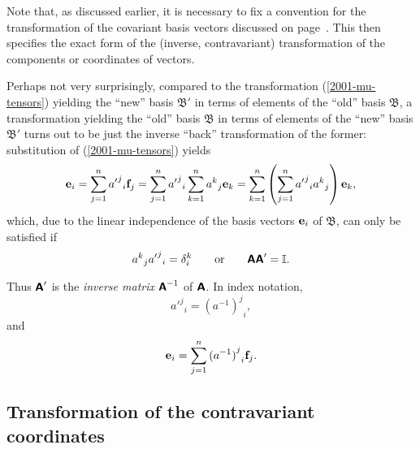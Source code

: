 Note that, as discussed earlier, it is necessary to fix a convention for the transformation of the covariant basis vectors discussed on page~\pageref{2016-m-ch-fdvs-oic}.
This then specifies the exact form of the (inverse, contravariant) transformation of the components or coordinates of vectors.



Perhaps not very surprisingly, compared to the transformation (\ref{2001-mu-tensors}) yielding the ``new'' basis
${\mathfrak B'}$  in terms of elements of the ``old'' basis ${\mathfrak B}$,
a transformation  yielding the ``old'' basis
${\mathfrak B}$  in terms of elements of the ``new'' basis ${\mathfrak B'}$ turns out to be just the inverse ``back'' transformation of the former:
substitution of (\ref{2001-mu-tensors}) yields
\begin{equation}
{\bf e}_i=\sum_{j=1}^n {{a'}^j}_i {\bf f}_j
=\sum_{j=1}^n {{a'}^j}_i  \sum_{k=1}^n {a^k}_j {\bf e}_k
=\sum_{k=1}^n \left(\sum_{j=1}^n  {{a'}^j}_i  {a^k}_j \right) {\bf e}_k,
\end{equation}
which, due to the linear independence of the basis vectors ${\bf e}_i$ of ${\mathfrak B}$,
can only be satisfied if
\begin{equation}
{a^k}_j  {{a'}^j}_i =\delta_i^k
\qquad
{\rm or}
\qquad
\textsf{\textbf{A}}\textsf{\textbf{A}}'={\Bbb I}.
\end{equation}

Thus $\textsf{\textbf{A}}'$ is the {\em inverse matrix}
$\textsf{\textbf{A}}^{-1}$  of $\textsf{\textbf{A}}$. In index notation,
\begin{equation}
{{a'}^j}_i ={{(a^{-1})}^j}_i
,
\label{2001-mu-tensor-tl2}
\end{equation}
and
\begin{equation}
{\bf e}_i=\sum_{j=1}^n {{(a^{-1})}^j}_i  {\bf f}_j
.
\label{2012-m-ch-tlcbv}
\end{equation}

\subsection{Transformation of the contravariant coordinates}


